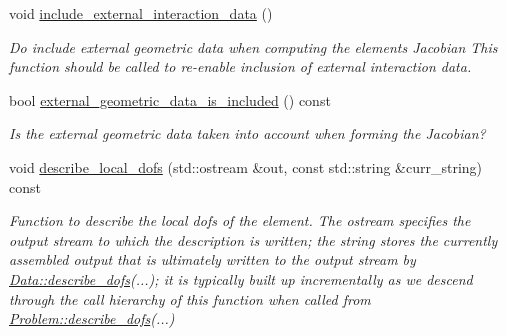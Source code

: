 \begin{DoxyCompactItemize}
$$void \hyperlink{classoomph_1_1ElementWithExternalElement_aac430d183896ee8a560d3a5c4143ad8d}{include\+\_\+external\+\_\+interaction\+\_\+data} ()
\begin{DoxyCompactList}\small\item\em Do include external geometric data when computing the element\textquotesingle{}s Jacobian This function should be called to re-\/enable inclusion of external interaction data. \end{DoxyCompactList}\item 
bool \hyperlink{classoomph_1_1ElementWithExternalElement_a1d06766dadb846bca94f49365809606e}{external\+\_\+geometric\+\_\+data\+\_\+is\+\_\+included} () const
\begin{DoxyCompactList}\small\item\em Is the external geometric data taken into account when forming the Jacobian? \end{DoxyCompactList}\item 
void \hyperlink{classoomph_1_1ElementWithExternalElement_a2a1753bed2e822d399aa3525f1bdac4b}{describe\+\_\+local\+\_\+dofs} (std\+::ostream \&out, const std\+::string \&curr\+\_\+string) const
\begin{DoxyCompactList}\small\item\em Function to describe the local dofs of the element. The ostream specifies the output stream to which the description is written; the string stores the currently assembled output that is ultimately written to the output stream by \hyperlink{classoomph_1_1Data_a2dae16e2dcff9a40029f834c83364df5}{Data\+::describe\+\_\+dofs}(...); it is typically built up incrementally as we descend through the call hierarchy of this function when called from \hyperlink{classoomph_1_1Problem_abc103804eb319ae0b3d43870cc3e1eaf}{Problem\+::describe\+\_\+dofs}(...) \end{DoxyCompactList}\end{DoxyCompactItemize}
